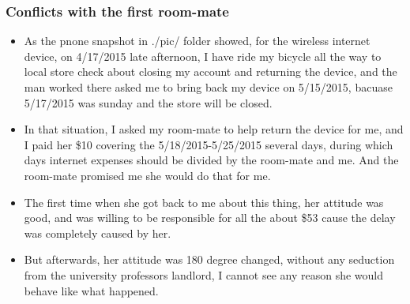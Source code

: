 \documentclass[9pt,b5paper]{article}
\begin{document}
\subsubsection{Conflicts with the first room-mate}
\label{sec-2-3-3}
\begin{itemize}
\item As the pnone snapshot in ./pic/ folder showed, for the wireless internet device, on 4/17/2015 late afternoon, I have ride my bicycle all the way to local store check about closing my account and returning the device, and the man worked there asked me to bring back my device on 5/15/2015, bacuase 5/17/2015 was sunday and the store will be closed.
\item In that situation, I asked my room-mate to help return the device for me, and I paid her \$10 covering the 5/18/2015-5/25/2015 several days, during which days internet expenses should be divided by the room-mate and me. And the room-mate promised me she would do that for me.
\item The first time when she got back to me about this thing, her attitude was good, and was willing to be responsible for all the about \$53 cause the delay was completely caused by her.
\item But afterwards, her attitude was 180 degree changed, without any seduction from the university professors landlord, I cannot see any reason she would behave like what happened. 


\end{itemize}
\end{document}
